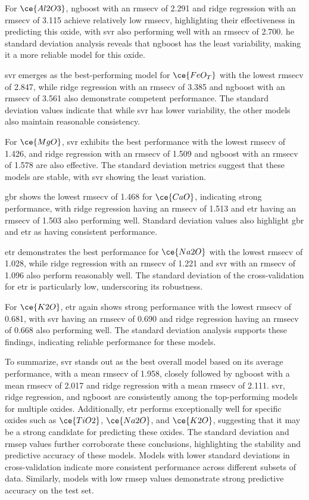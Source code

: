 For $\ce{Al2O3}$, \gls{ngboost} with an \gls{rmsecv} of 2.291 and ridge regression with an \gls{rmsecv} of 3.115 achieve relatively low \gls{rmsecv}, highlighting their effectiveness in predicting this oxide, with \gls{svr} also performing well with an \gls{rmsecv} of 2.700.
he standard deviation analysis reveals that \gls{ngboost} has the least variability, making it a more reliable model for this oxide.

\gls{svr} emerges as the best-performing model for $\ce{FeO_T}$ with the lowest \gls{rmsecv} of 2.847, while ridge regression with an \gls{rmsecv} of 3.385 and \gls{ngboost} with an \gls{rmsecv} of 3.561 also demonstrate competent performance.
The standard deviation values indicate that while \gls{svr} has lower variability, the other models also maintain reasonable consistency.

For $\ce{MgO}$, \gls{svr} exhibits the best performance with the lowest \gls{rmsecv} of 1.426, and ridge regression with an \gls{rmsecv} of 1.509 and \gls{ngboost} with an \gls{rmsecv} of 1.578 are also effective.
The standard deviation metrics suggest that these models are stable, with \gls{svr} showing the least variation.

\gls{gbr} shows the lowest \gls{rmsecv} of 1.468 for $\ce{CaO}$, indicating strong performance, with ridge regression having an \gls{rmsecv} of 1.513 and \gls{etr} having an \gls{rmsecv} of 1.503 also performing well.
Standard deviation values also highlight \gls{gbr} and \gls{etr} as having consistent performance.

\gls{etr} demonstrates the best performance for $\ce{Na2O}$ with the lowest \gls{rmsecv} of 1.028, while ridge regression with an \gls{rmsecv} of 1.221 and \gls{svr} with an \gls{rmsecv} of 1.096 also perform reasonably well.
The standard deviation of the cross-validation for \gls{etr} is particularly low, underscoring its robustness.

For $\ce{K2O}$, \gls{etr} again shows strong performance with the lowest \gls{rmsecv} of 0.681, with \gls{svr} having an \gls{rmsecv} of 0.690 and ridge regression having an \gls{rmsecv} of 0.668 also performing well.
The standard deviation analysis supports these findings, indicating reliable performance for these models.

To summarize, \gls{svr} stands out as the best overall model based on its average performance, with a mean \gls{rmsecv} of 1.958, closely followed by \gls{ngboost} with a mean \gls{rmsecv} of 2.017 and ridge regression with a mean \gls{rmsecv} of 2.111. \gls{svr}, ridge regression, and \gls{ngboost} are consistently among the top-performing models for multiple oxides.
Additionally, \gls{etr} performs exceptionally well for specific oxides such as $\ce{TiO2}$, $\ce{Na2O}$, and $\ce{K2O}$, suggesting that it may be a strong candidate for predicting these oxides.
The standard deviation and \gls{rmsep} values further corroborate these conclusions, highlighting the stability and predictive accuracy of these models.
Models with lower standard deviations in cross-validation indicate more consistent performance across different subsets of data.
Similarly, models with low \gls{rmsep} values demonstrate strong predictive accuracy on the test set.


